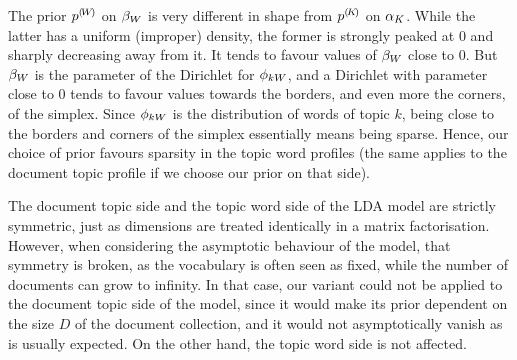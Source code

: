 The prior ${p}^{(\!{W}\!)}$ on $\beta_W$ is very different in shape from ${p}^{(\!{K}\!)}$ on $\alpha_K$. While the latter has a uniform (improper) density, the former is strongly peaked at $0$ and sharply decreasing away from it. It tends to favour values of $\beta_W$ close to $0$. But $\beta_W$ is the parameter of the Dirichlet for $\phi_{kW}$, and a Dirichlet with parameter close to 0 tends to favour values towards the borders, and even more the corners, of the simplex. Since $\phi_{kW}$ is the distribution of words of topic $k$, being close to the borders and corners of the simplex essentially means being sparse. Hence, our choice of prior favours sparsity in the topic word profiles (the same applies to the document topic profile if we choose our prior on that side).

The document topic side and the topic word side of the LDA model are strictly symmetric, just as dimensions are treated identically in a matrix factorisation. However, when considering the asymptotic behaviour of the model, that symmetry is broken, as the vocabulary is often seen as fixed, while the number of documents can grow to infinity. In that case, our variant could not be applied to the document topic side of the model, since it would make its prior dependent on the size $D$ of the document collection, and it would not asymptotically vanish as is usually expected. On the other hand, the topic word side is not affected.